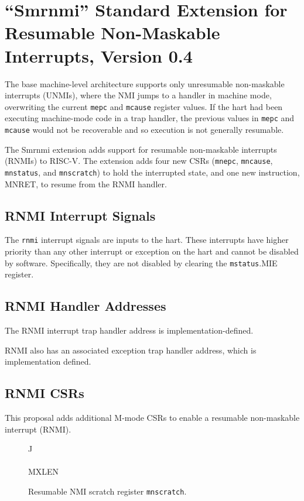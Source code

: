 \chapter{``Smrnmi'' Standard Extension for Resumable Non-Maskable Interrupts, Version 0.4}
\label{chap:rnmi}

The base machine-level architecture supports only
unresumable non-maskable interrupts (UNMIs), where the NMI jumps to a
handler in machine mode, overwriting the current {\tt mepc} and {\tt mcause}
register values.  If the hart had been executing machine-mode code in
a trap handler, the previous values in {\tt mepc} and {\tt mcause} would not
be recoverable and so execution is not generally resumable.

The Smrnmi extension adds support for resumable non-maskable interrupts
(RNMIs) to RISC-V.  The extension adds four new CSRs ({\tt mnepc},
{\tt mncause}, {\tt mnstatus}, and {\tt mnscratch}) to hold the interrupted state,
and one new instruction, MNRET, to resume from the RNMI handler.

\section{RNMI Interrupt Signals}

The {\tt rnmi} interrupt signals are inputs to
the hart.  These interrupts have higher priority than any other
interrupt or exception on the hart and cannot be disabled by software.
Specifically, they are not disabled by clearing the {\tt mstatus}.MIE
register.

\section{RNMI Handler Addresses}

The RNMI interrupt trap handler address is implementation-defined.

RNMI also has an associated exception trap handler address, which is
implementation defined.

\section{RNMI CSRs}

This proposal adds additional M-mode CSRs to enable a resumable
non-maskable interrupt (RNMI).

\begin{figure*}[h!]
{\footnotesize
\begin{center}
\setlength{\tabcolsep}{4pt}
\begin{tabular}{J}
 \\
\hline
{} \\
\hline
MXLEN \\
\end{tabular}
\end{center}
}
\vspace{-0.1in}
\caption{Resumable NMI scratch register {\tt mnscratch}.}
\label{fig:mnscratch}
\end{figure*}

